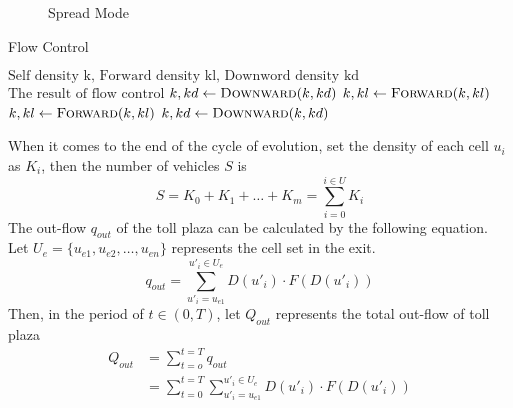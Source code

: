 \documentclass{mcmthesis}
\begin{document}
\begin{figure}[!htbp]
	\centering
	 \hspace{.3\textwidth}
	\caption{Spread Mode}
	\label{fig:sp_exm}
\end{figure}
\begin{algorithm}
	\begin{algorithmic}
	\caption{\label{alg:flow_ctl}Flow Control}
        \Require $\text{Self density k, Forward density kl, Downword density kd}$
		\Ensure $\text{The result of flow control}$
					\State $k,kd \gets \Call{Downward}{k,kd}$
					\State $k,kl \gets \Call{Forward}{k,kl}$
				\Else
					\State $k,kl \gets \Call{Forward}{k,kl}$
					\State $k,kd \gets \Call{Downward}{k,kd}$
			\EndIf
			\State {}
		\EndFunction
\end{algorithmic}
\end{algorithm}
When it comes to the end of the cycle of evolution, set the density of each cell $u_i$ as $K_i$, then the number of vehicles $S$ is
\begin{equation}
	S=K_0+K_1+\dots+K_m=\sum_{i=0}^{i \in U} K_i
\end{equation}
The out-flow $q_{out}$ of the toll plaza can be calculated by the following equation. Let $U_e=\{u_{e1},u_{e2},\dots,u_{en}\}$ represents the cell set in the exit.
\begin{equation}
	q_{out}=\sum_{u'_i=u_{e1}}^{u'_i\in U_e}D(u'_i) \cdot F(D(u'_i) )
\end{equation}
Then, in the period of $ t\in (0,T)$, let $Q_{out}$ represents the total out-flow of toll plaza
\begin{equation}
	\begin{split}
	Q_{out}&=\sum_{t=o}^{t=T}q_{out}\\
	&=\sum_{t=0}^{t=T}\sum_{u'_i=u_{e1}}^{u'_i\in U_e}D(u'_i) \cdot F(D(u'_i) )
	\end{split}
\end{equation}
\end{document}
